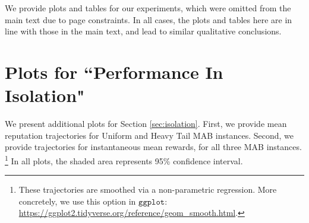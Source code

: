 \documentclass[../competing_bandits_with_appendix.tex]{subfiles}
\begin{document}
\begin{appendices}

We provide plots and tables for our experiments, which were omitted from the main text due to page constraints. In all cases, the plots and tables here are in line with those in the main text, and lead to similar qualitative conclusions.

\section{Plots for ``Performance In Isolation"}

We present additional plots for Section \ref{sec:isolation}. First, we provide mean reputation trajectories for Uniform and Heavy Tail MAB instances. Second, we provide trajectories for instantaneous mean rewards, for all three MAB instances.%
\footnote{These trajectories are smoothed via a non-parametric regression.
More concretely, we use this option in $\texttt{ggplot}$:
\url{https://ggplot2.tidyverse.org/reference/geom_smooth.html}.}
In all plots, the shaded area represents 95\% confidence interval.


\end{appendices}
\end{document}
